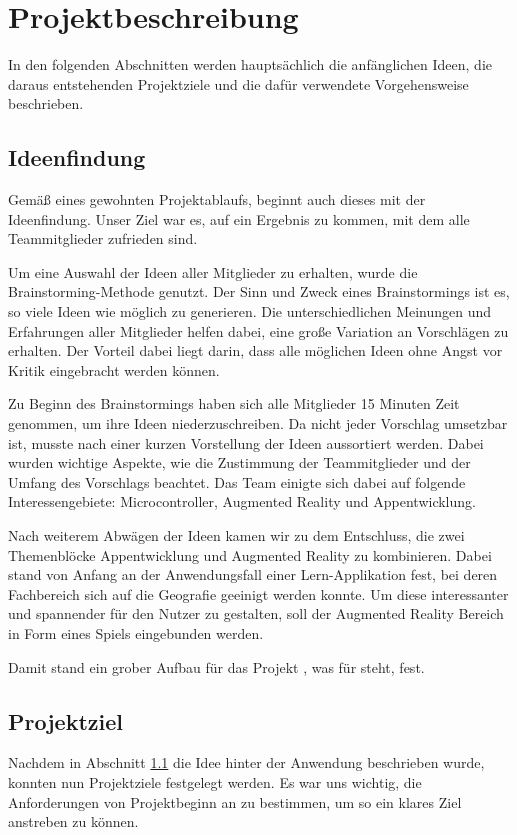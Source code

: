 \chapter{Projektbeschreibung}\label{ch:projektbeschreibung}
In den folgenden Abschnitten werden hauptsächlich die anfänglichen Ideen, die daraus entstehenden Projektziele und die dafür verwendete Vorgehensweise beschrieben.

\section{Ideenfindung}\label{ideenfindung}
Gemäß eines gewohnten Projektablaufs, beginnt auch dieses mit der Ideenfindung. Unser Ziel war es, auf ein Ergebnis zu kommen, mit dem alle Teammitglieder zufrieden sind.

Um eine Auswahl der Ideen aller Mitglieder zu erhalten, wurde die Brainstorming-Methode genutzt. Der Sinn und Zweck eines Brainstormings ist es, so viele Ideen wie möglich zu generieren. Die unterschiedlichen Meinungen und Erfahrungen aller Mitglieder helfen dabei, eine große Variation an Vorschlägen zu erhalten. Der Vorteil dabei liegt darin, dass alle möglichen Ideen ohne Angst vor Kritik eingebracht werden können.

Zu Beginn des Brainstormings haben sich alle Mitglieder 15 Minuten Zeit genommen, um ihre Ideen niederzuschreiben. Da nicht jeder Vorschlag umsetzbar ist, musste nach einer kurzen Vorstellung der Ideen aussortiert werden. Dabei wurden wichtige Aspekte, wie die Zustimmung der Teammitglieder und der Umfang des Vorschlags beachtet. Das Team einigte sich dabei auf folgende Interessengebiete: Microcontroller, Augmented Reality und Appentwicklung.

Nach weiterem Abwägen der Ideen kamen wir zu dem Entschluss, die zwei Themenblöcke Appentwicklung und Augmented Reality zu kombinieren. Dabei stand von Anfang an der Anwendungsfall einer Lern-Applikation fest, bei deren Fachbereich sich auf die Geografie geeinigt werden konnte. Um diese interessanter und spannender für den Nutzer zu gestalten, soll der Augmented Reality Bereich in Form eines Spiels eingebunden werden. 

Damit stand ein grober Aufbau für das Projekt , was für  steht, fest.

\section{Projektziel}\label{projektziel}
Nachdem in Abschnitt \ref{ideenfindung} die Idee hinter der Anwendung beschrieben wurde, konnten nun Projektziele festgelegt werden. Es war uns wichtig, die Anforderungen von Projektbeginn an zu bestimmen, um so ein klares Ziel anstreben zu können.

